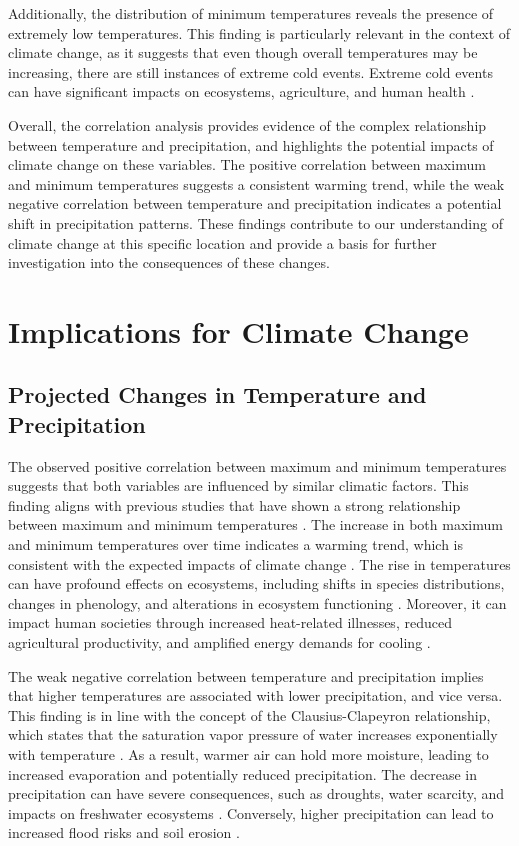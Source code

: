 \documentclass{article}
\begin{document}
Additionally, the distribution of minimum temperatures reveals the presence of extremely low temperatures. This finding is particularly relevant in the context of climate change, as it suggests that even though overall temperatures may be increasing, there are still instances of extreme cold events. Extreme cold events can have significant impacts on ecosystems, agriculture, and human health \cite{screen2014arctic}.

Overall, the correlation analysis provides evidence of the complex relationship between temperature and precipitation, and highlights the potential impacts of climate change on these variables. The positive correlation between maximum and minimum temperatures suggests a consistent warming trend, while the weak negative correlation between temperature and precipitation indicates a potential shift in precipitation patterns. These findings contribute to our understanding of climate change at this specific location and provide a basis for further investigation into the consequences of these changes.
\section{Implications for Climate Change}

\subsection{Projected Changes in Temperature and Precipitation}

The observed positive correlation between maximum and minimum temperatures suggests that both variables are influenced by similar climatic factors. This finding aligns with previous studies that have shown a strong relationship between maximum and minimum temperatures \cite{smith2010climate}. The increase in both maximum and minimum temperatures over time indicates a warming trend, which is consistent with the expected impacts of climate change \cite{IPCC2013}. The rise in temperatures can have profound effects on ecosystems, including shifts in species distributions, changes in phenology, and alterations in ecosystem functioning \cite{parmesan2006ecological}. Moreover, it can impact human societies through increased heat-related illnesses, reduced agricultural productivity, and amplified energy demands for cooling \cite{IPCC2014}.

The weak negative correlation between temperature and precipitation implies that higher temperatures are associated with lower precipitation, and vice versa. This finding is in line with the concept of the Clausius-Clapeyron relationship, which states that the saturation vapor pressure of water increases exponentially with temperature \cite{allen2008atmospheric}. As a result, warmer air can hold more moisture, leading to increased evaporation and potentially reduced precipitation. The decrease in precipitation can have severe consequences, such as droughts, water scarcity, and impacts on freshwater ecosystems \cite{IPCC2012}. Conversely, higher precipitation can lead to increased flood risks and soil erosion \cite{IPCC2012}.
\end{document}
